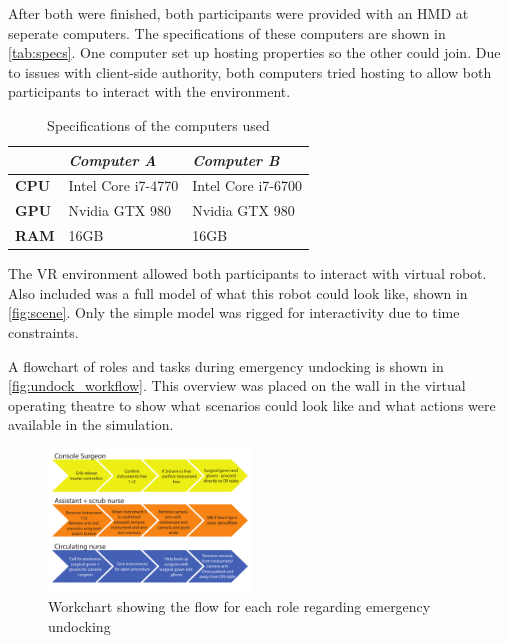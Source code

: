 \documentclass[conference]{IEEEtran}
\begin{document}
After both were finished, both participants were provided with an HMD at seperate computers. The specifications of these computers are shown in \autoref{tab:specs}. One computer set up hosting properties so the other could join. Due to issues with client-side authority, both computers tried hosting to allow both participants to interact with the environment. %

\begin{table}
\centering
\begin{tabularx}{0.48\textwidth}{X X X}
\toprule
                     & \textit{Computer A} & \textit{Computer B} \\ \midrule \rowcolor{lightGrey}
\textbf{CPU}         & Intel Core i7-4770  & Intel Core i7-6700  \\

\textbf{GPU}         & Nvidia GTX 980      & Nvidia GTX 980    \\  \rowcolor{lightGrey}

\textbf{RAM} 		 & 16GB                & 16GB                 \\ \toprule
\end{tabularx}
\caption{Specifications of the computers used}
\label{tab:specs}
\end{table}

The VR environment allowed both participants to interact with virtual robot. Also included was a full model of what this robot could look like, shown in \autoref{fig:scene}. Only the simple model was rigged for interactivity due to time constraints.


A flowchart of roles and tasks during emergency undocking is shown in \autoref{fig:undock_workflow}. This overview was placed on the wall in the virtual operating theatre to show what scenarios could look like and what actions were available in the simulation. 

\begin{figure}[h]
	\centering
	\includegraphics[width=0.48\textwidth]{figures/workflow_chart}
	\caption{Workchart showing the flow for each role regarding emergency undocking}
	\label{fig:undock_workflow}
\end{figure}
\end{document}

